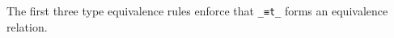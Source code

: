 \documentclass[authoryear, acmsmall, screen, review, nonacm]{acmart}
\begin{document}
The first three type equivalence rules enforce that \verb!_≡t_! forms an equivalence relation.
\begin{code}%
\>[0]\AgdaSpace{}%
\AgdaSpace{}%
\<%
\\
\>[0][@{}l@{\AgdaIndent{0}}]%
\>[4]\AgdaSpace{}%
\AgdaSymbol{:}\AgdaSpace{}%
\AgdaSpace{}%
\AgdaSpace{}%
\<%
\\
%
\>[4]\AgdaSpace{}%
\AgdaSymbol{:}\AgdaSpace{}%
\AgdaSpace{}%
\AgdaSpace{}%
\AgdaSpace{}%
\AgdaSpace{}%
\AgdaSpace{}%
\AgdaSpace{}%
\<%
\\
%
\>[4]\AgdaSpace{}%
\AgdaSymbol{:}\AgdaSpace{}%
\AgdaSpace{}%
\AgdaSpace{}%
\AgdaSpace{}%
\AgdaSpace{}%
\AgdaSpace{}%
\AgdaSpace{}%
\AgdaSpace{}%
\AgdaSpace{}%
\AgdaSpace{}%
\AgdaSpace{}%
\<%
\end{code} 
\end{document}
